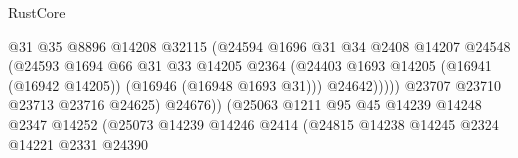 \begin{lexlean}{RustCore}
\begin{coremodule}
                                                @31
                                                @35
                                                @8896
                                                @14208
                                                @32115
                                                (@24594
                                                  @1696
                                                  @31
                                                  @34
                                                  @2408
                                                  @14207
                                                  @24548
                                                  (@24593
                                                    @1694
                                                    @66
                                                    @31
                                                    @33
                                                    @14205
                                                    @2364
                                                    (@24403
                                                      @1693
                                                      @14205
                                                      (@16941 (@16942 @14205))
                                                      (@16946 (@16948 @1693 @31)))
                                                    @24642)))))
                                          @23707
                                          @23710
                                          @23713
                                          @23716
                                          @24625)
                                        @24676))
                                    (@25063
                                      @1211
                                      @95
                                      @45
                                      @14239
                                      @14248
                                      @2347
                                      @14252
                                      (@25073
                                        @14239
                                        @14246
                                        @2414
                                        (@24815
                                          @14238
                                          @14245
                                          @2324
                                          @14221
                                          @2331
                                          @24390

\end{coremodule}
\end{lexlean}
